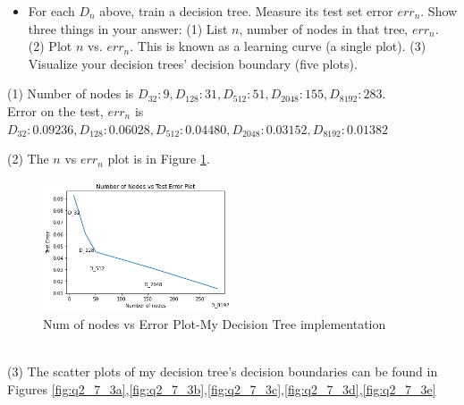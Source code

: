 \documentclass[a4paper]{article}
\theoremstyle{definition}
\newenvironment{soln}{
    \leavevmode\color{blue}\ignorespaces
}{}
\begin{document}
\begin{enumerate}
\begin{itemize}
  \item For each $D_n$ above, train a decision tree.  Measure its test set error $err_n$.  Show three things in your answer: (1) List $n$, number of nodes in that tree, $err_n$. (2) Plot $n$ vs. $err_n$.  This is known as a learning curve (a single plot). (3) Visualize your decision trees' decision boundary (five plots). \\
  \end{itemize}
  \begin{soln}
      (1) Number of nodes is $D_{32}: 9, D_{128}: 31, D_{512}: 51, D_{2048}: 155, D_{8192}: 283$.\\
      Error on the test, $err_n$ is $D_{32}:  0.09236, D_{128}: 0.06028, D_{512}: 0.04480, D_{2048}: 0.03152, D_{8192}: 0.01382$

      (2) The $n$ vs $err_n$ plot is in Figure \ref{fig:q2-7}.\\
      
      \begin{figure}[h!]
        \centering
        \includegraphics[width=0.5\textwidth]{images/q2_7_errorvsnode.png}
        \caption{Num of nodes vs Error Plot-My Decision Tree implementation}
        \label{fig:q2-7}
    \end{figure} \\
    (3) The scatter plots of my decision tree's decision boundaries can be found in Figures \ref{fig:q2_7_3a},\ref{fig:q2_7_3b},\ref{fig:q2_7_3c},\ref{fig:q2_7_3d},\ref{fig:q2_7_3e}


\end{soln}
\end{enumerate}
\end{document}
